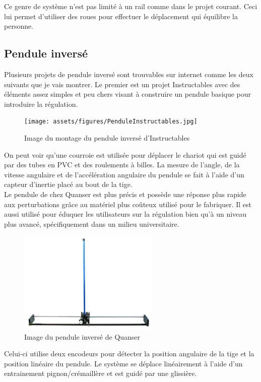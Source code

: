Ce genre de système n'est pas limité à un rail comme dans le projet courant. Ceci lui permet d'utiliser des roues pour effectuer le déplacement qui équilibre la personne.

\subsection{Pendule inversé}

Plusieurs projets de pendule inversé sont trouvables sur internet comme les deux suivants que je vais montrer.
Le premier est un projet Instructables avec des éléments assez simples et peu chers visant à construire un pendule basique
pour introduire la régulation.

\begin{figure}[H]
    \centering
    \texttt{[image: assets/figures/PenduleInstructables.jpg]}
    \caption{Image du montage du pendule inversé d'Instructables \cite{Instructables}}
    \label{fig:Instructables}
\end{figure}

On peut voir qu'une courroie est utilisée pour déplacer le chariot qui est guidé par des tubes en PVC et des roulements à billes. La mesure de l'angle, de la vitesse angulaire et de l'accélération angulaire du pendule se fait à l'aide d'un capteur d'inertie placé au bout de la tige.\\

Le pendule de chez Quanser est plus précis et possède une réponse plus rapide aux perturbations grâce au matériel plus coûteux utilisé pour le fabriquer. Il est aussi utilisé pour éduquer les utilisateurs sur la régulation bien qu'à un niveau plus avancé, spécifiquement dans un milieu universitaire.

\begin{figure}[H]
    \centering
    \includegraphics[width = 0.6\textwidth]{assets/figures/PenduleQuanser.png}
    \caption{Image du pendule inversé de Quanser \cite{Quanser}}
    \label{fig:Quanser}
\end{figure}

Celui-ci utilise deux encodeurs pour détecter la position angulaire de la tige et la position linéaire du pendule. Le système se déplace linéairement à l'aide d'un entrainement pignon/crémaillère et est guidé par une glissière.